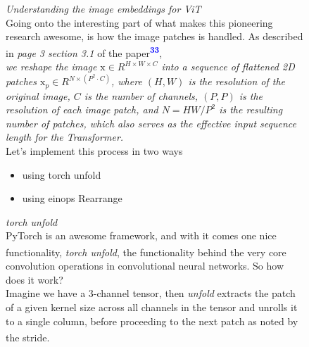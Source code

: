 \documentclass[12pt]{article}
\newcommand{\customtext}[3]{%
    \vspace{#2} %
    \fontsize{13}{8}\textcolor{#1}{\textit{#3}}%
}
\newcommand{\sidecite}[1]{\textsuperscript{\textcolor{blue}{\textbf{\scriptsize#1}}}}
\newcommand{\customtitle}[1]{\fontsize{14}{8}\textcolor{xtitle}{\textit{#1}}\\}
\newcommand{\maincitecount}{\sidecite{\stepcounter{maincite}\themaincite}}
\begin{document}
\begin{figure}[!htb]
    \begin{minipage}[t]{0.65\textwidth}
    \raggedright
    \customtext{xtitle}{0em}{Understanding the image embeddings for ViT}\\
    Going onto the interesting part of what makes this pioneering research awesome, 
    is how the image patches is handled.
    As described in {\it page 3 section 3.1} of the paper\sidecite{33},
    \vspace{1em}\\
    {\it\small we reshape the image $\text{x}\in R^{H\times W\times C}$ into a 
    sequence of flattened 2D patches $\text{x}_p\in R^{N\times (P^2\cdot C)}$,
    where $(H,W)$ is the resolution of the original image, $C$ is the number 
    of channels, $(P,P)$ is the resolution of each image patch, and $N = HW/P^2$ 
    is the resulting number of patches, which also serves as the effective 
    input sequence length for the Transformer.}
    \vspace{1em}\\
    Let's implement this process in two ways
    \begin{itemize}[left=0pt,topsep=0pt,itemsep=-1ex,parsep=0ex]
        \item using torch unfold
        \item using einops Rearrange
      \end{itemize}
      \vspace{1em}
      \customtitle{torch unfold}
      PyTorch is an awesome framework, and with it comes one nice functionality, 
      {\it torch unfold}{\maincitecount}, the functionality behind the very core 
      convolution operations in convolutional neural networks. So how does it work?\\
      Imagine we have a 3-channel tensor, then {\it unfold} extracts the patch of a given 
      kernel size across all channels in the tensor and unrolls it to a single column, 
      before proceeding to the next patch as noted by the stride\maincitecount.
\begin{figure}[H]
\end{figure}
\end{minipage}
\end{figure}
\end{document}
